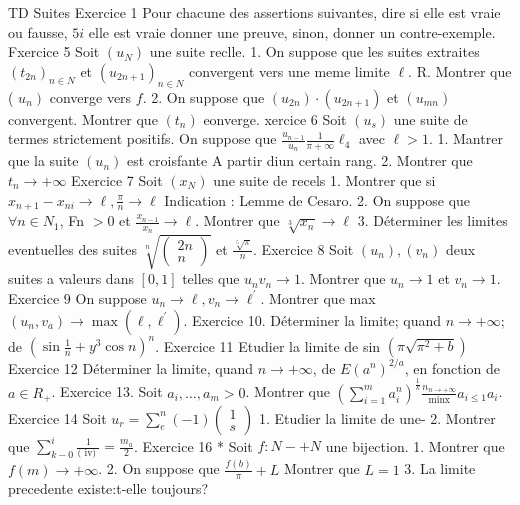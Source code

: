 \documentclass[a4paper,11pt]{article}
\theoremstyle{definition}
\begin{document}
TD Suites
Exercice 1 Pour chacune des assertions suivantes, dire si elle est vraie ou fausse, $5 i$ elle est vraie donner une preuve, sinon, donner un contre-exemple.
Fxercice 5 Soit $\left(u_N\right)$ une suite reclle.
1. On suppose que les suites extraites $\left(t_{2 n}\right)_{n \in N}$ et $\left(u_{2 n+1}\right)_{n \in N}$ convergent vers une meme limite $\ell$. R. Montrer que ( $\left.u_n\right)$ converge vers $f$.
2. On suppose que $\left(u_{2 n}\right) \cdot\left(u_{2 n+1}\right)$ et $\left(u_{m n}\right)$ convergent. Montrer que $\left(t_n\right)$ eonverge. xercice 6 Soit $\left(u_s\right)$ une suite de termes strictement positifs. On suppose que $\frac{u_{n-1}}{u_n} \frac{1}{\pi+\infty} \ell_4$ avec $\ell>1$.
1. Mantrer que la suite $\left(u_n\right)$ est croisfante A partir diun certain rang.
2. Montrer que $t_n \rightarrow+\infty$
Exercice 7 Soit $\left(x_N\right)$ une suite de recels
1. Montrer que si $x_{n+1}-x_{n i} \rightarrow \ell, \frac{\pi}{n} \rightarrow \ell$
Indication : Lemme de Cesaro.
2. On suppose que $\forall n \in N_1$, Fn $>0$ et $\frac{x_{n-1}}{x_n} \rightarrow \ell$. Montrer que $\sqrt[3]{x_n} \rightarrow \ell$
3. Déterminer les limites eventuelles des suites $\sqrt[n]{\left(\begin{array}{c}2 n \\ n\end{array}\right)}$ et $\frac{\sqrt[5]{\pi}}{n}$.
Exercice 8 Soit $\left(u_n\right),\left(v_n\right)$ deux suites a valeurs dans $[0,1]$ telles que $u_n v_n \rightarrow 1$. Montrer que $u_n \rightarrow 1$ et $v_n \rightarrow 1$.
Exercice 9 On suppose $u_n \rightarrow \ell, v_n \rightarrow \ell^{\prime}$. Montrer que max $\left(u_n, v_a\right) \rightarrow \operatorname{max}\left(\ell, \ell^{\prime}\right)$.
Exercice 10. Déterminer la limite; quand $n \rightarrow+\infty$; de $\left(\sin \frac{1}{n}+y^3 \cos n\right)^n$.
Exercice 11 Etudier la limite de sin $\left(\pi \sqrt{\pi^2+b}\right)$
Exercice 12 Déterminer la limite, quand $n \rightarrow+\infty$, de $E\left(a^n\right)^{2 / a}$, en fonction de $a \in R_{+}$.
Exercice 13. Soit $a_i, \ldots, a_m>0$. Montrer que $\left(\sum_{i=1}^m a_i^n\right)^{\frac{1}{k}} \frac{n_{n \rightarrow+\infty}}{\operatorname{minx}} a_{i \leq 1} a_i$.
Exercice 14 Soit $u_r=\sum_e^n(-1)\left(\begin{array}{l}1 \\ s\end{array}\right)$
1. Etudier la limite de une-
2. Montrer que $\sum_{k-0}^i \frac{1}{(\text{ iv) }}=\frac{m_a}{2}$.
Exercice 16 * Soit $f: N-+N$ une bijection.
1. Montrer que $f(m) \rightarrow+\infty$.
2. On suppose que $\frac{f(b)}{\pi}+L$ Montrer que $L=1$
3. La limite precedente existe:t-elle toujours?
\end{document}
